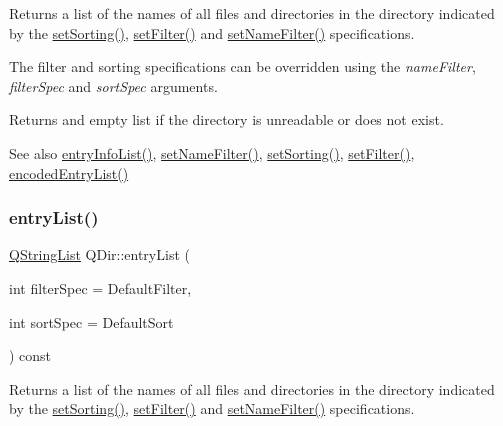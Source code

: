 Returns a list of the names of all files and directories in the directory indicated by the \mbox{\hyperlink{class_q_dir_a65280d204cd65975953e3eb2a63da778}{set\+Sorting()}}, \mbox{\hyperlink{class_q_dir_a68d9e723870b5f8226353dc6047a35ee}{set\+Filter()}} and \mbox{\hyperlink{class_q_dir_a26b95e183a9ba9410219a3ce4d8c3416}{set\+Name\+Filter()}} specifications.

The filter and sorting specifications can be overridden using the {\itshape name\+Filter}, {\itshape filter\+Spec} and {\itshape sort\+Spec} arguments.

Returns and empty list if the directory is unreadable or does not exist.

\begin{DoxySeeAlso}{See also}
\mbox{\hyperlink{class_q_dir_ada9ea9da108cbebd0ac88231f39fced0}{entry\+Info\+List()}}, \mbox{\hyperlink{class_q_dir_a26b95e183a9ba9410219a3ce4d8c3416}{set\+Name\+Filter()}}, \mbox{\hyperlink{class_q_dir_a65280d204cd65975953e3eb2a63da778}{set\+Sorting()}}, \mbox{\hyperlink{class_q_dir_a68d9e723870b5f8226353dc6047a35ee}{set\+Filter()}}, \mbox{\hyperlink{class_q_dir_a584e15a955a13bcabc9ec4b0330b7d5d}{encoded\+Entry\+List()}} 
\end{DoxySeeAlso}
\mbox{\label{class_q_dir_ab5e2b4ce772dc4b8941425cf780df9ab}} 
\subsubsection{\texorpdfstring{entryList()}{entryList()}\hspace{0.1cm}{\footnotesize\ttfamily [2/2]}}
{\footnotesize\ttfamily \mbox{\hyperlink{class_q_string_list}{Q\+String\+List}} Q\+Dir\+::entry\+List (\begin{DoxyParamCaption}\item[{int}]{filter\+Spec = {\ttfamily DefaultFilter},  }\item[{int}]{sort\+Spec = {\ttfamily DefaultSort} }\end{DoxyParamCaption}) const\hspace{0.3cm}{\ttfamily [virtual]}}

Returns a list of the names of all files and directories in the directory indicated by the \mbox{\hyperlink{class_q_dir_a65280d204cd65975953e3eb2a63da778}{set\+Sorting()}}, \mbox{\hyperlink{class_q_dir_a68d9e723870b5f8226353dc6047a35ee}{set\+Filter()}} and \mbox{\hyperlink{class_q_dir_a26b95e183a9ba9410219a3ce4d8c3416}{set\+Name\+Filter()}} specifications.


